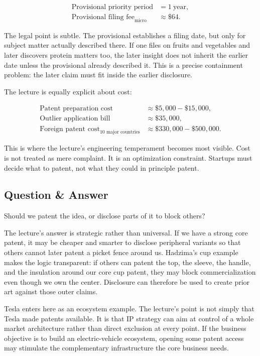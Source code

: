 \begin{align}
\text{Provisional priority period} &= 1\ \text{year},\\
\text{Provisional filing fee}_{\text{micro}} &\approx \$64.
\end{align}

The legal point is subtle. The provisional establishes a filing date, but only for subject matter actually described there. If one files on fruits and vegetables and later discovers protein matters too, the later insight does not inherit the earlier date unless the provisional already described it. This is a precise containment problem: the later claim must fit inside the earlier disclosure.

The lecture is equally explicit about cost:

\begin{align}
\text{Patent preparation cost} &\approx \$5{,}000-\$15{,}000,\\
\text{Outlier application bill} &\approx \$35{,}000,\\
\text{Foreign patent cost}_{10\text{ major countries}} &\approx \$330{,}000-\$500{,}000.
\end{align}

This is where the lecture's engineering temperament becomes most visible. Cost is not treated as mere complaint. It is an optimization constraint. Startups must decide what to patent, not what they could in principle patent.

\subsection{Question \& Answer}

Should we patent the idea, or disclose parts of it to block others?

The lecture's answer is strategic rather than universal. If we have a strong core patent, it may be cheaper and smarter to disclose peripheral variants so that others cannot later patent a picket fence around us. Hadzima's cup example makes the logic transparent: if others can patent the top, the sleeve, the handle, and the insulation around our core cup patent, they may block commercialization even though we own the center. Disclosure can therefore be used to create prior art against those outer claims.

Tesla enters here as an ecosystem example. The lecture's point is not simply that Tesla made patents available. It is that IP strategy can aim at control of a whole market architecture rather than direct exclusion at every point. If the business objective is to build an electric-vehicle ecosystem, opening some patent access may stimulate the complementary infrastructure the core business needs.

